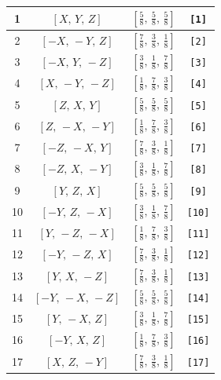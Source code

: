\documentclass[fleqn,8pt]{jsarticle}
\begin{document}
\begin{longtable}{cccc}
1 & $\left[ X,\, Y,\, Z \right]$ & $\left[ \frac{5}{8},\, \frac{5}{8},\, \frac{5}{8} \right]$ & {\tt [1]} \\ \hline
2 & $\left[ - X,\, - Y,\, Z \right]$ & $\left[ \frac{7}{8},\, \frac{3}{8},\, \frac{1}{8} \right]$ & {\tt [2]} \\ \hline
3 & $\left[ - X,\, Y,\, - Z \right]$ & $\left[ \frac{3}{8},\, \frac{1}{8},\, \frac{7}{8} \right]$ & {\tt [3]} \\ \hline
4 & $\left[ X,\, - Y,\, - Z \right]$ & $\left[ \frac{1}{8},\, \frac{7}{8},\, \frac{3}{8} \right]$ & {\tt [4]} \\ \hline
5 & $\left[ Z,\, X,\, Y \right]$ & $\left[ \frac{5}{8},\, \frac{5}{8},\, \frac{5}{8} \right]$ & {\tt [5]} \\ \hline
6 & $\left[ Z,\, - X,\, - Y \right]$ & $\left[ \frac{1}{8},\, \frac{7}{8},\, \frac{3}{8} \right]$ & {\tt [6]} \\ \hline
7 & $\left[ - Z,\, - X,\, Y \right]$ & $\left[ \frac{7}{8},\, \frac{3}{8},\, \frac{1}{8} \right]$ & {\tt [7]} \\ \hline
8 & $\left[ - Z,\, X,\, - Y \right]$ & $\left[ \frac{3}{8},\, \frac{1}{8},\, \frac{7}{8} \right]$ & {\tt [8]} \\ \hline
9 & $\left[ Y,\, Z,\, X \right]$ & $\left[ \frac{5}{8},\, \frac{5}{8},\, \frac{5}{8} \right]$ & {\tt [9]} \\ \hline
10 & $\left[ - Y,\, Z,\, - X \right]$ & $\left[ \frac{3}{8},\, \frac{1}{8},\, \frac{7}{8} \right]$ & {\tt [10]} \\ \hline
11 & $\left[ Y,\, - Z,\, - X \right]$ & $\left[ \frac{1}{8},\, \frac{7}{8},\, \frac{3}{8} \right]$ & {\tt [11]} \\ \hline
12 & $\left[ - Y,\, - Z,\, X \right]$ & $\left[ \frac{7}{8},\, \frac{3}{8},\, \frac{1}{8} \right]$ & {\tt [12]} \\ \hline
13 & $\left[ Y,\, X,\, - Z \right]$ & $\left[ \frac{7}{8},\, \frac{3}{8},\, \frac{1}{8} \right]$ & {\tt [13]} \\ \hline
14 & $\left[ - Y,\, - X,\, - Z \right]$ & $\left[ \frac{5}{8},\, \frac{5}{8},\, \frac{5}{8} \right]$ & {\tt [14]} \\ \hline
15 & $\left[ Y,\, - X,\, Z \right]$ & $\left[ \frac{3}{8},\, \frac{1}{8},\, \frac{7}{8} \right]$ & {\tt [15]} \\ \hline
16 & $\left[ - Y,\, X,\, Z \right]$ & $\left[ \frac{1}{8},\, \frac{7}{8},\, \frac{3}{8} \right]$ & {\tt [16]} \\ \hline
17 & $\left[ X,\, Z,\, - Y \right]$ & $\left[ \frac{7}{8},\, \frac{3}{8},\, \frac{1}{8} \right]$ & {\tt [17]} \\ \hline

\end{longtable}
\end{document}
